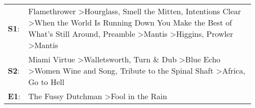 \begin{supertabular}{p{0.03\textwidth}p{0.92\textwidth}}
 \textbf{S1}:  &  Flamethrower\textsuperscript{} \textgreater \enspace Hourglass\textsuperscript{}, \enspace Smell the Mitten\textsuperscript{}, \enspace Intentions Clear\textsuperscript{} \textgreater \enspace When the World Is Running Down You Make the Best of What's Still Around\textsuperscript{}, \enspace Preamble\textsuperscript{} \textgreater \enspace Mantis\textsuperscript{} \textgreater \enspace Higgins\textsuperscript{}, \enspace Prowler\textsuperscript{} \textgreater \enspace Mantis\textsuperscript{}  \enspace  \\
 \textbf{S2}:  &                                                                                                                            Miami Virtue\textsuperscript{} \textgreater \enspace Walletsworth\textsuperscript{}, \enspace Turn \& Dub\textsuperscript{} \textgreater \enspace Blue Echo\textsuperscript{} \textgreater \enspace Women Wine and Song\textsuperscript{}, \enspace Tribute to the Spinal Shaft\textsuperscript{} \textgreater \enspace Africa\textsuperscript{}, \enspace Go to Hell\textsuperscript{}  \enspace  \\
 \textbf{E1}:  &                                                                                                                                                                                                                                                                                                                                                                                                                      The Fussy Dutchman\textsuperscript{} \textgreater \enspace Fool in the Rain\textsuperscript{}  \enspace  \\
\end{supertabular}

